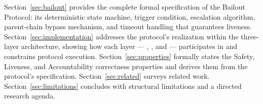 Section~\ref{sec:bailout} provides the complete formal specification of the Bailout Protocol: its deterministic state machine, trigger condition, escalation algorithm, parent-chain bypass mechanism, and timeout handling that guarantees liveness. Section~\ref{sec:implementation} addresses the protocol's realization within the \bxthree three-layer architecture, showing how each layer — \purpose, \bounds, and \fact — participates in and constrains protocol execution. Section~\ref{sec:properties} formally states the Safety, Liveness, and Accountability correctness properties and derives them from the protocol's specification. Section~\ref{sec:related} surveys related work. Section~\ref{sec:limitations} concludes with structural limitations and a directed research agenda.